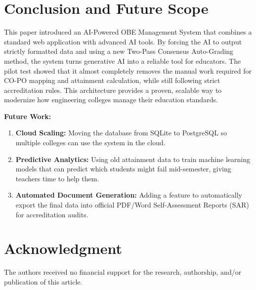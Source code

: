 \documentclass[conference]{IEEEtran}
\begin{document}
\section{Conclusion and Future Scope}

This paper introduced an AI-Powered OBE Management System that combines a standard web application with advanced AI tools. By forcing the AI to output strictly formatted data and using a new Two-Pass Consensus Auto-Grading method, the system turns generative AI into a reliable tool for educators. The pilot test showed that it almost completely removes the manual work required for CO-PO mapping and attainment calculation, while still following strict accreditation rules. This architecture provides a proven, scalable way to modernize how engineering colleges manage their education standards.

\textbf{Future Work:} 
\begin{enumerate}
    \item \textbf{Cloud Scaling:} Moving the database from SQLite to PostgreSQL so multiple colleges can use the system in the cloud.
    \item \textbf{Predictive Analytics:} Using old attainment data to train machine learning models that can predict which students might fail mid-semester, giving teachers time to help them.
    \item \textbf{Automated Document Generation:} Adding a feature to automatically export the final data into official PDF/Word Self-Assessment Reports (SAR) for accreditation audits.
\end{enumerate}

\section*{Acknowledgment}
The authors received no financial support for the research, authorship, and/or publication of this article.
\end{document}
